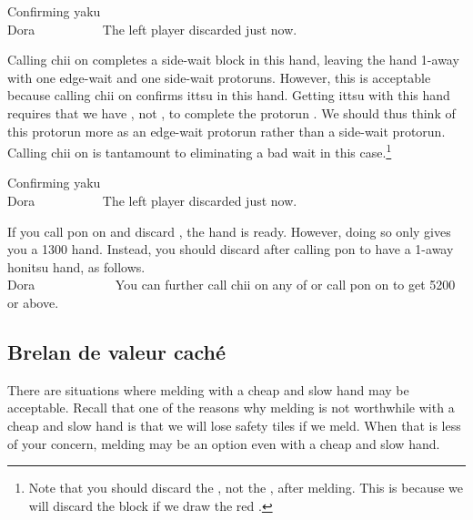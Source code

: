 \bigskip
\begin{itembox}[r]{Confirming {\jap yaku}}
\bp
{}\rfs{}~~\\
\hfill\footnotesize{{\jap Dora}~~~~~~~~~~}
\ep
\vspace{-20pt}The left player discarded {\LARGE{}} just now.
\end{itembox}
\noindent
Calling {\jap chii} on {\LARGE{}} completes a side-wait block in this hand, leaving the hand 1-away with one edge-wait and one side-wait protoruns. 
However, this is acceptable because calling {\jap chii} on {\LARGE{}} confirms {\jap ittsu} in this hand. Getting {\jap ittsu} with this hand requires that we have {\LARGE{}}, not {\LARGE{}}, to complete the protorun {\LARGE{}}. We should thus think of this protorun more as an edge-wait protorun rather than a side-wait protorun. Calling {\jap chii} on {\LARGE{}} is tantamount to eliminating a bad wait in this case.\footnote{Note that you should discard the , not the , after melding. This is because we will discard the {} block if we draw the red \rfw.}

\bigskip
\begin{itembox}[r]{Confirming {\jap yaku}}
\bp
{}\dong\dong\dong\nan\nan~~\fa\\
\hfill\footnotesize{{\jap Dora}~~~~~~~~~~}
\ep {}
\vspace{-20pt}The left player discarded {\LARGE{}} just now.
\end{itembox}
\noindent
If you call {\jap pon} on {\LARGE{}} and discard {\LARGE{}}, the hand is ready. However, doing so only gives you a 1300 hand. Instead, you should discard {\LARGE{}} after calling {\jap pon} to have a 1-away {\jap honitsu} hand, as follows.
\bp
{}\dong\dong\dong\nan\nan~~~\fa\\
\hfill\footnotesize{{\jap Dora}~~~~~~~~~~~~}
\ep
You can further call {\jap chii} on any of {\LARGE{}} or call {\jap pon} on {\LARGE\nan} to get 5200 or above. 

\subsection{Brelan de valeur caché}
There are situations where melding with a cheap and slow hand may be acceptable. Recall that one of the reasons why melding is not worthwhile with a cheap and slow hand is that we will lose safety tiles if we meld. When that is less of your concern, melding may be an option even with a cheap and slow hand. 

